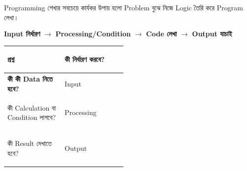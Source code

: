 
Programming শেখার সবচেয়ে কার্যকর উপায় হলো Problem বুঝে নিজে
Logic তৈরি করে Program লেখা।

\begin{center}

\textbf{Input নির্ধারণ}
\(\longrightarrow\)
\textbf{Processing/Condition}
\(\longrightarrow\)
\textbf{Code লেখা}
\(\longrightarrow\)
\textbf{Output যাচাই}

\end{center}



\begin{tabularx}
{\linewidth}
{
|>{\bfseries\RaggedRight\arraybackslash}p{0.48\linewidth}
|Y|
}

\hline
{}

\textbf{প্রশ্ন}
&
\textbf{কী নির্ধারণ করবে?}
\\
\hline

কী কী Data নিতে হবে?
&
Input
\\
\hline

কী Calculation বা Condition লাগবে?
&
Processing
\\
\hline

কী Result দেখাতে হবে?
&
Output
\\
\hline

\end{tabularx}



